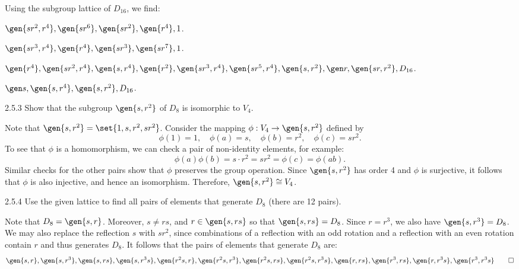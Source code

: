 \begin{sol}
    Using the subgroup lattice of $D_{16}$, we find:
    \begin{subexercises}
        \item $\gen{sr^2, r^4}, \gen {sr^6}, \gen{sr^2}, \gen{r^4}, 1$.
        \item $\gen{sr^3, r^4}, \gen{r^4}, \gen{sr^3}, \gen{sr^7}, 1$.
        \item $\gen{r^4}, \gen{sr^2, r^4}, \gen{s, r^4}, \gen{r^2}, \gen{sr^3, r^4}, \gen{sr^5, r^4}, \gen{s, r^2}, \gen r, \gen{sr, r^2}, D_{16}$.
        \item $\gen s, \gen{s, r^4}, \gen{s, r^2}, D_{16}$. \qedhere
    \end{subexercises}
\end{sol}

\begin{exercise}{2.5.3}
    Show that the subgroup $\gen{s, r^2}$ of $D_8$ is isomorphic to $V_4$.
\end{exercise}

\begin{sol}
    Note that $\gen{s, r^2} = \set{1, s, r^2, sr^2}$.
	Consider the mapping $\phi : V_4 \to \gen{s, r^2}$ defined by
    \[
    	\phi(1) = 1, \quad \phi(a) = s, \quad \phi(b) = r^2, \quad \phi(c) = sr^2.
    \]
    To see that $\phi$ is a homomorphism, we can check a pair of non-identity elements, for example:
    \[
    	\phi(a)\phi(b) = s \cdot r^2 = sr^2 = \phi(c) = \phi(ab).
    \]
    Similar checks for the other pairs show that $\phi$ preserves the group operation.
	Since $\gen{s, r^2}$ has order 4 and $\phi$ is surjective, it follows that $\phi$ is also injective, and hence an isomorphism.
	Therefore, $\gen{s, r^2} \cong V_4$.
\end{sol}

\begin{exercise}{2.5.4}
    Use the given lattice to find all pairs of elements that generate $D_8$ (there are 12 pairs).
\end{exercise}

\begin{sol}
    Note that $D_8 = \gen{s, r}$.
	Moreover, $s \neq rs$, and $r \in \gen{s, rs}$ so that $\gen{s, rs} = D_8$.
	Since $r = r^3$, we also have $\gen{s, r^3} = D_8$.
	We may also replace the reflection $s$ with $sr^2$, since combinations of a reflection with an odd rotation and a reflection with an even rotation contain $r$ and thus generates $D_8$.
	It follows that the pairs of elements that generate $D_8$ are:
    \[
    	\gen{s, r}, \gen{s, r^3}, \gen{s, rs}, \gen{s, r^3s}, \gen{r^2s, r}, \gen{r^2s, r^3}, \gen{r^2s, rs}, \gen{r^2s, r^3s}, \gen{r, rs}, \gen{r^3, rs}, \gen{r, r^3s}, \gen{r^3, r^3s} \qedhere
    \]
\end{sol}

